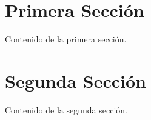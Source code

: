 \documentclass{ui1activity}
\begin{document}
\makecustomcover

\tableofcontents
\newpage

\clearpage

\section{Primera Sección}
Contenido de la primera sección.



\section{Segunda Sección}
Contenido de la segunda sección.
\end{document}
